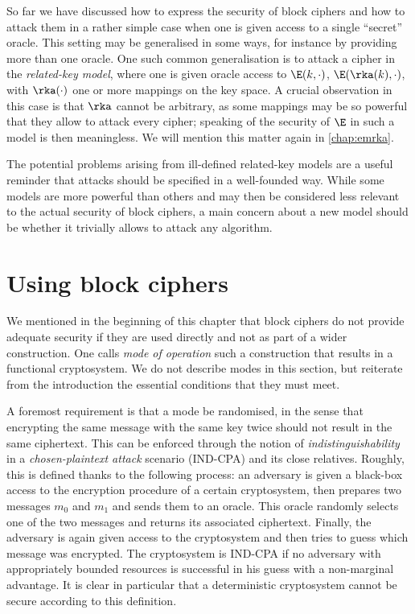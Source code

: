 So far we have discussed how to express the security of block ciphers and how to attack them in a rather simple case when one is given access to a single ``secret'' oracle. This setting may be generalised
in some ways, for instance by providing more than one oracle. One such common generalisation is to attack a cipher in the \emph{related-key model}, where one is given oracle access to
$\E(k,\cdot)$, $\E(\rka(k),\cdot)$, with $\rka(\cdot)$ one or more mappings on the key space. A crucial observation in this case is that $\rka$ cannot be arbitrary, as some mappings may
be so powerful that they allow to attack every cipher; speaking of the security of $\E$ in such a model is then meaningless. We will mention this matter again in \autoref{chap:emrka}.

The potential problems arising from ill-defined related-key models are a useful reminder that attacks should be specified in a well-founded way.
While some models are more powerful than others and may then be considered less relevant to the actual security of block ciphers, a main concern
about a new model should be whether it trivially allows to attack any algorithm. 

\section{Using block ciphers}
\label{sec:bc_modes}

We mentioned in the beginning of this chapter that block ciphers do not provide adequate security if they are used directly and not as part of a wider construction. One calls \emph{mode
of operation} such a construction that results in a functional cryptosystem. We do not describe modes in this section, but reiterate from the introduction the essential conditions that they
must meet.

A foremost requirement is that a mode be randomised, in the sense that encrypting the same message with the same key twice should not result in the same ciphertext. This can be
enforced through the notion of \emph{indistinguishability} in a \emph{chosen-plaintext attack} scenario (\textsf{IND-CPA}) and its close relatives. Roughly, this is
defined thanks to the following process: an adversary is given a black-box access to the encryption procedure of a certain cryptosystem, then prepares two messages $m_0$ and $m_1$ and sends them to an oracle. This oracle randomly selects one of the two messages and
returns its associated ciphertext. Finally, the adversary is again given access to the cryptosystem and then tries to guess which message was encrypted. The cryptosystem is \textsf{IND-CPA}
if no adversary with appropriately bounded resources is successful in his guess with a non-marginal advantage. It is clear in particular that a deterministic cryptosystem cannot be secure according
to this definition.

